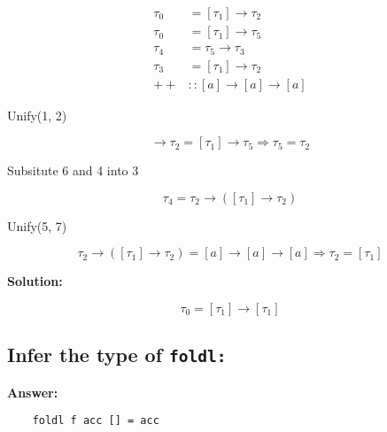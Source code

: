 \documentclass{article}
\begin{document}
\begin{align}
	\tau_0 &= [\tau_1] \rightarrow \tau_2\\
	\tau_0 &= [\tau_1] \rightarrow \tau_5\\
	\tau_4 &= \tau_5 \rightarrow \tau_3\\
	\tau_3 &= [\tau_1] \rightarrow \tau_2\\
	++ &:: [a] \rightarrow [a] \rightarrow [a]
\end{align}

\begin{center} Unify(1, 2) \end{center}
\begin{equation}  
	[\tau_1] \rightarrow \tau_2 = [\tau_1] \rightarrow \tau_5 \Rightarrow
	\tau_5 = \tau_2 \end{equation}

\begin{center} Subsitute 6 and 4 into 3 \end{center}
\begin{equation}  
	\tau_4 = \tau_2 \rightarrow ([\tau_1] \rightarrow \tau_2) \end{equation}  

\begin{center} Unify(5, 7) \end{center}
\begin{equation}  
	\tau_2 \rightarrow ([\tau_1] \rightarrow \tau_2) = [a] \rightarrow [a]
	\rightarrow [a] \Rightarrow \tau_2 = [\tau_1]
\end{equation}  


\begin{center} \textbf{Solution: }\end{center}
\begin{equation*}  
	\tau_0 = [\tau_1] \rightarrow [\tau_1] \end{equation*}  

\subsection{Infer the type of \texttt{foldl:}}
\setcounter{equation}{-1}
\textbf{Answer:}\\
\begin{lstlisting}
	foldl f acc [] = acc
\end{lstlisting}

\\
\end{document}
